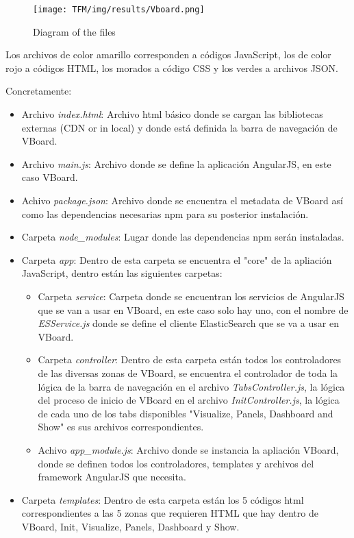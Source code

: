 \documentclass[a4paper, 12pt]{book}
\begin{document}
\begin{figure}[H]
  \centering
  \texttt{[image: TFM/img/results/Vboard.png]}
  \caption{Diagram of the files}
  \label{fig:codediagram}
\end{figure}

Los archivos de color amarillo corresponden a códigos JavaScript, los de color rojo a códigos HTML, los morados a código CSS y los verdes a archivos JSON.

Concretamente:
\begin{itemize}
    \item Archivo \textit{index.html}: Archivo html básico donde se cargan las bibliotecas externas (CDN or in local) y donde está definida la barra de navegación de VBoard.
    \item Archivo \textit{main.js}: Archivo donde se define la aplicación AngularJS, en este caso VBoard.
    \item Achivo \textit{package.json}: Archivo donde se encuentra el metadata de VBoard así como las dependencias necesarias npm para su posterior instalación.
    \item Carpeta \textit{node\_modules}: Lugar donde las dependencias npm serán instaladas.
    \item Carpeta \textit{app}: Dentro de esta carpeta se encuentra el "core" de la apliación JavaScript, dentro están las siguientes carpetas:
    \begin{itemize}
        \item Carpeta \textit{service}: Carpeta donde se encuentran los servicios de AngularJS que se van a usar en VBoard, en este caso solo hay uno, con el nombre de \textit{ESService.js} donde se define el cliente ElasticSearch que se va a usar en VBoard.
        \item Carpeta \textit{controller}: Dentro de esta carpeta están todos los controladores de las diversas zonas de VBoard, se encuentra el controlador de toda la lógica de la barra de navegación en el archivo \textit{TabsController.js}, la lógica del proceso de inicio de VBoard en el archivo \textit{InitController.js}, la lógica de cada uno de los tabs disponibles "Visualize, Panels, Dashboard and Show" es sus archivos correspondientes.
        \item Achivo \textit{app\_module.js}: Archivo donde se instancia la apliación VBoard, donde se definen todos los controladores, templates y archivos del framework AngularJS que necesita.
    \end{itemize}
    \item Carpeta \textit{templates}: Dentro de esta carpeta están los 5 códigos html correspondientes a las 5 zonas que requieren HTML que hay dentro de VBoard, Init, Visualize, Panels, Dashboard y Show.

\end{itemize}
\end{document}
